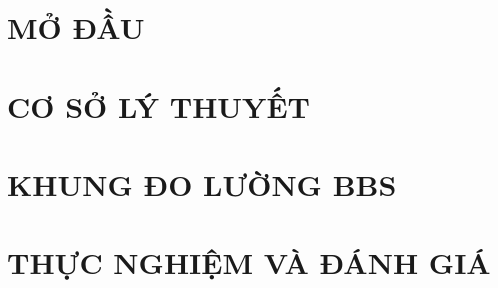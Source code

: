 ﻿\documentclass[a4paper,13pt,3p,twoside]{report}
\renewcommand{\listtablename}{DANH MỤC BẢNG BIỂU}
\theoremstyle{definition}
\begin{document}
\renewcommand{\listtablename}{DANH MỤC BẢNG BIỂU}
{\let\oldnumberline\numberline
\renewcommand{\numberline}{Bảng~\oldnumberline}
\listoftables}

\glsaddall 
 \renewcommand*{\glossaryname}{DANH SÁCH THUẬT NGỮ}
\renewcommand*{\acronymname}{DANH MỤC THUẬT NGỮ VÀ TỪ VIẾT TẮT}
\renewcommand*{\entryname}{Thuật ngữ}
\renewcommand*{\descriptionname}{Ý nghĩa}
\printnoidxglossaries


% 


\newpage
{}

\pagestyle{fancy}
\fancyhf{}
\fancyhead[RE, LO]{\leftmark}
\fancyfoot[RE, LO]{\thepage}

\chapter*{MỞ ĐẦU}
\label{chapter:Introduction}


\newpage
\chapter{CƠ SỞ LÝ THUYẾT}
\label{chapter:Related_works}



\newpage
\chapter{KHUNG ĐO LƯỜNG BBS}
\label{chapter:Methodology}


\newpage
\chapter{THỰC NGHIỆM VÀ ĐÁNH GIÁ}
\label{chapter:Experiment}


\newpage
\end{document}
